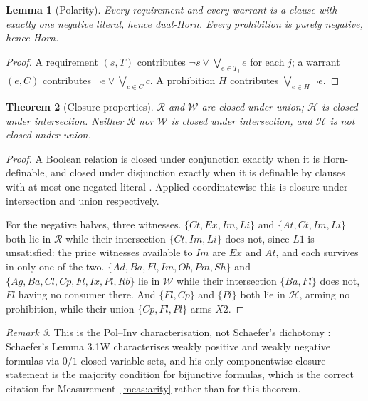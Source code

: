 \documentclass[11pt,reqno]{amsart}
\theoremstyle{plain}
\newtheorem{theorem}{Theorem}[section]
\newtheorem{lemma}[theorem]{Lemma}
\theoremstyle{definition}
\theoremstyle{remark}
\newtheorem{remark}[theorem]{Remark}
\begin{document}
\begin{lemma}[Polarity]\label{lem:polarity}
Every requirement and every warrant is a clause with exactly one negative
literal, hence dual-Horn. Every prohibition is purely negative, hence Horn.
\end{lemma}

\begin{proof}
A requirement $(s,T)$ contributes $\neg s \vee \bigvee_{e \in T_j} e$ for each
$j$; a warrant $(e,C)$ contributes $\neg e \vee \bigvee_{c \in C} c$. A
prohibition $H$ contributes $\bigvee_{e \in H} \neg e$.
\end{proof}

\begin{theorem}[Closure properties]\label{thm:closure}
$\mathcal{R}$ and $\mathcal{W}$ are closed under union; $\mathcal{H}$ is closed
under intersection. Neither $\mathcal{R}$ nor $\mathcal{W}$ is closed under
intersection, and $\mathcal{H}$ is not closed under union.
\end{theorem}

\begin{proof}
A Boolean relation is closed under conjunction exactly when it is Horn-definable,
and closed under disjunction exactly when it is definable by clauses with at most
one negated literal \cite[Ex.~5.3.5]{jeavons1997}. Applied coordinatewise this is
closure under intersection and union respectively.

For the negative halves, three witnesses. $\{Ct,Ex,Im,Li\}$ and
$\{At,Ct,Im,Li\}$ both lie in $\mathcal{R}$ while their intersection
$\{Ct,Im,Li\}$ does not, since $L1$ is unsatisfied: the price witnesses
available to $Im$ are $Ex$ and $At$, and each survives in only one of the two. $\{Ad,Ba,Fl,Im,Ob,
Pm,Sh\}$ and $\{Ag,Ba,Cl,Cp,Fl,Ix,Pl,Rb\}$ lie in $\mathcal{W}$ while their
intersection $\{Ba,Fl\}$ does not, $Fl$ having no consumer there. And
$\{Fl,Cp\}$ and $\{Pl\}$ both lie in $\mathcal{H}$, arming no
prohibition, while their union $\{Cp,Fl,Pl\}$ arms $X2$.
\end{proof}

\begin{remark}
This is the Pol--Inv characterisation, not Schaefer's dichotomy
\cite{schaefer1978}: Schaefer's Lemma 3.1W characterises weakly positive and
weakly negative formulas via $0/1$-closed variable sets, and his only
componentwise-closure statement is the majority condition for bijunctive
formulas, which is the correct citation for
Measurement~\ref{meas:arity} rather than for this theorem.
\end{remark}
\end{document}

